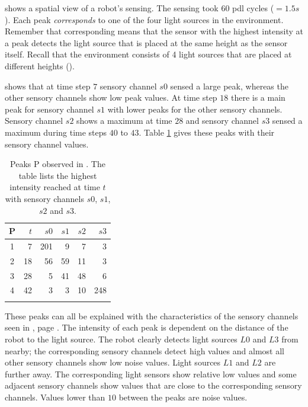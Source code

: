 
 shows a spatial view of a robot's sensing. The sensing took 60 {\sc pdl} cycles ($=1.5 s$). Each peak {\em corresponds} to one of the four light sources in the environment. Remember that corresponding means that the sensor with the highest intensity at a peak detects the light source that is placed at the same height as the sensor itself. Recall that the environment consists of 4 light sources that are placed at different heights (). 

 shows that at time step $7$ sensory channel $s0$ sensed a large peak, whereas the other sensory channels show low peak values. At time step $18$ there is a main peak  for sensory channel $s1$ with lower peaks for the other sensory channels. Sensory channel $s2$ shows a maximum at time $28$ and sensory channel $s3$ sensed a maximum during time steps $40$ to $43$. Table \ref{t:perception1} gives these peaks with their sensory channel values.

\begin{table}
\centering
\begin{tabular}{crrrrr}
\lsptoprule
P & $t$ & $s0$ & $s1$ & $s2$ & $s3$\\
\midrule
1 & 7 & 201 & 9 & 7 & 3\\
2 & 18 & 56 & 59 & 11 & 3\\
3 & 28 & 5 & 41 & 48 & 6\\
4 & 42 & 3 & 3 & 10 & 248\\
\lspbottomrule
\end{tabular}
\caption{Peaks P observed in . The table lists the highest intensity reached at time $t$ with sensory channels $s0$, $s1$, $s2$ and $s3$.}
\label{t:perception1}
\end{table}

These peaks can all be explained with the characteristics of the sensory channels seen in , page \pageref{f:robots:calibration}.  The intensity of each peak is dependent on the distance of the robot to the light source. The robot clearly detects light sources $L0$ and $L3$ from nearby; the corresponding sensory channels detect high values and almost all other sensory channels show low noise values. Light sources $L1$ and $L2$ are further away. The corresponding light sensors show relative low values and some adjacent sensory channels show values that are close to the corresponding sensory channels. Values lower than $10$ between the peaks are noise values.

